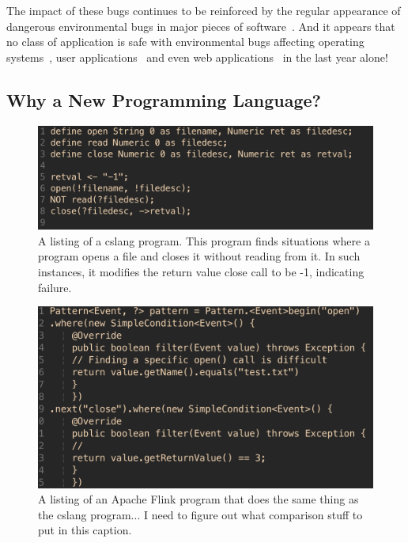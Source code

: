 The impact of these bugs continues to be reinforced by the regular
appearance of dangerous environmental bugs in major pieces of
software~\cite{devzeroroot}.  And it appears that no class of application
is safe with environmental bugs affecting operating systems~\cite{bad},
user applications~\cite{bad} and even web applications~\cite{bad} in the
last year alone!





\subsection{Why a New Programming Language?}
\begin{figure}
  \includegraphics[scale=.50]{images/cslanglisting}
  \caption{A listing of a cslang program.  This program finds situations
  where a program opens a file and closes it without reading from it.  In
  such instances, it modifies the return value close call to be -1,
  indicating failure.}
  \label{fig:cslanglisting}
\end{figure}

\begin{figure}
  \includegraphics[scale=.50]{images/flinklisting}
  \caption{A listing of an Apache Flink program that does the same thing as the
  cslang program... I need to figure out what comparison stuff to put in
  this caption.}
  \label{fig:flinklisting}
\end{figure}


